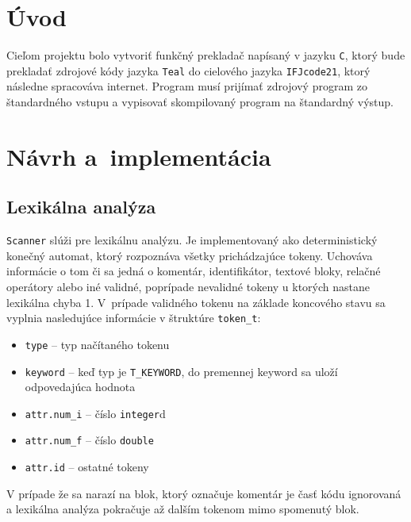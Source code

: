 \documentclass[a4paper, 11pt]{article}
\begin{document}
    \setcounter{page}{1}

    \section{Úvod}
    Cieľom projektu bolo vytvoriť funkčný prekladač napísaný v jazyku \texttt{C}, ktorý bude prekladať zdrojové kódy jazyka
    \texttt{Teal} do cielového jazyka \texttt{IFJcode21}, ktorý následne spracováva internet.
    Program musí prijímať zdrojový program zo štandardného vstupu a vypisovať skompilovaný program na štandardný výstup.




    \section{Návrh a~implementácia}

    \subsection{Lexikálna analýza}
    \texttt{Scanner} slúži pre lexikálnu analýzu. Je implementovaný ako deterministický konečný automat, ktorý rozpoznáva všetky
    prichádzajúce tokeny. Uchováva informácie o tom či sa jedná o komentár, identifikátor, textové bloky, relačné
    operátory alebo iné validné, poprípade nevalidné tokeny u ktorých nastane lexikálna chyba 1. V~prípade validného
    tokenu na základe koncového stavu sa vyplnia nasledujúce informácie v štruktúre \texttt{token\_t}:
    \begin{itemize}
        \item \texttt{type}  --  typ načítaného tokenu
        \item \texttt{keyword} -- keď typ je \texttt{T\_KEYWORD}, do premennej keyword sa uloží odpovedajúca hodnota
        \item \texttt{attr.num\_i} -- číslo \texttt{integer}d
        \item \texttt{attr.num\_f} -- číslo \texttt{double}
        \item \texttt{attr.id} -- ostatné tokeny
    \end{itemize}
    V prípade že sa narazí na blok, ktorý označuje komentár je časť kódu ignorovaná a lexikálna analýza pokračuje
    až dalším tokenom mimo spomenutý blok.
\end{document}
